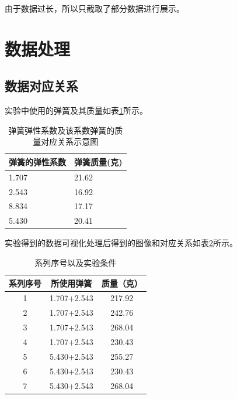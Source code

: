 \documentclass{ctexart}
\begin{document}
由于数据过长，所以只截取了部分数据进行展示。
\newpage

\section{数据处理}

  \subsection{数据对应关系}
  实验中使用的弹簧及其质量如表\ref{tanhuang}所示。
  \begin{table}[H]
    \centering   
    \caption{弹簧弹性系数及该系数弹簧的质量对应关系示意图}\label{tanhuang}
    \begin{tabular}{| l || l |}
        \hline
        弹簧的弹性系数 & 弹簧质量(克)\\
        \hline
        1.707 & 21.62 \\
        \hline
        2.543 & 16.92 \\
        \hline
        8.834 & 17.17 \\
        \hline
        5.430 & 20.41 \\
        \hline                       
    \end{tabular}
  \end{table}

  实验得到的数据可视化处理后得到的图像和对应关系如表\ref{guanxi}所示。
  \begin{table}[H]
    \centering   
    \caption{系列序号以及实验条件}\label{guanxi}
    \begin{tabular}{| c || c || c |}
        \hline
        系列序号 & 所使用弹簧 & 质量（克）\\
        \hline
        1 & 1.707+2.543 & 217.92\\
        \hline
        2 & 1.707+2.543 & 242.76\\
        \hline
        3 & 1.707+2.543 & 268.04\\
        \hline
        4 & 1.707+2.543 & 230.43\\
        \hline
        5 & 5.430+2.543 & 255.27\\
        \hline   
        6 & 5.430+2.543 & 230.43\\
        \hline
        7 & 5.430+2.543 & 268.04\\
        \hline                             
    \end{tabular}
  \end{table}
\end{document}
